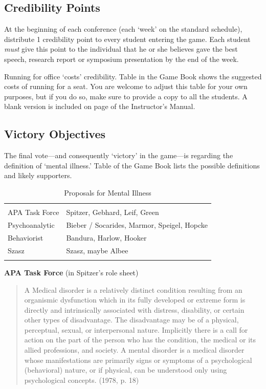 \begin{refsection}
\begin{itemize}
\end{itemize}

\subsection{Credibility Points}
\label{credibilitypoints}

At the beginning of each conference (each ‘week’ on the standard schedule), distribute 1 credibility point to every student entering the game. Each student \emph{must} give this point to the individual that he or she believes gave the best speech, research report or symposium presentation by the end of the week. 

Running for office ‘costs’ credibility. Table  in the Game Book shows the suggested costs of running for a seat. You are welcome to adjust this table for your own purposes, but if you do so, make sure to provide a copy to all the students. A blank version is included on page \pageref{sample: credibilitypointsmenu} of the Instructor's Manual.

\subsection{Victory Objectives}
\label{victoryobjectives}

The final vote---and consequently ‘victory’ in the game---is regarding the definition of ‘mental illness.’ Table  of the Game Book lists the possible definitions and likely supporters.

 \begin{longtable}[!t]{ | P{3cm} | P{8cm} |  }
\hline
{}&
\\
APA Task Force&
Spitzer, Gebhard, Leif, Green\\
Psychoanalytic&
Bieber / Socarides, Marmor, Speigel, Hopcke\\
Behaviorist&
Bandura, Harlow, Hooker\\
Szasz&
Szasz, maybe Albee\\ \hline
\caption{Proposals for Mental Illness}
\label{table: mentalillness}
\end{longtable}

\textbf{APA Task Force} (in Spitzer’s role sheet)

\begin{quote}

A Medical disorder is a relatively distinct condition resulting from an organismic dysfunction which in its fully developed or extreme form is directly and intrinsically associated with distress, disability, or certain other types of disadvantage. The disadvantage may be of a physical, perceptual, sexual, or interpersonal nature. Implicitly there is a call for action on the part of the person who has the condition, the medical or its allied professions, and society.
A mental disorder is a medical disorder whose manifestations are primarily signs or symptoms of a psychological (behavioral) nature, or if physical, can be understood only using psychological concepts. (1978, p. 18)
\end{quote}


\end{refsection}
